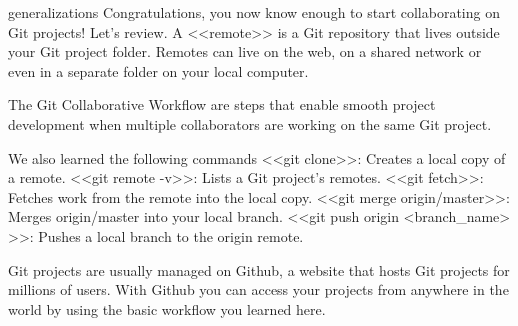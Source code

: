 generalizations
    Congratulations, you now know enough to start collaborating on Git projects! Let’s review.
        A <<remote>> is a Git repository that lives outside your Git project folder. Remotes can live on the web, on a shared network or even in a separate folder on your local computer.

        The Git Collaborative Workflow are steps that enable smooth project development when multiple collaborators are working on the same Git project.
        
    We also learned the following commands
        <<git clone>>: Creates a local copy of a remote.
        <<git remote -v>>: Lists a Git project’s remotes.
        <<git fetch>>: Fetches work from the remote into the local copy.
        <<git merge origin/master>>: Merges origin/master into your local branch.
        <<git push origin <branch_name> >>: Pushes a local branch to the origin remote.

    Git projects are usually managed on Github, a website that hosts Git projects for millions of users. With Github you can access your projects from anywhere in the world by using the basic workflow you learned here.